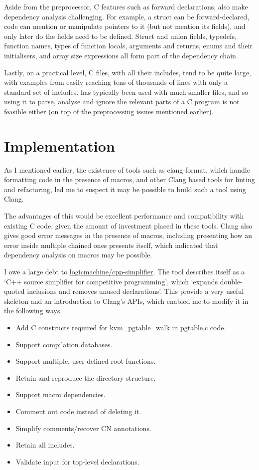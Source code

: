 Aside from the preprocessor, C features such as forward declarations, also make
dependency analysis challenging. For example, a struct can be forward-declared,
code can mention or manipulate pointers to it (but not mention its fields), and
only later do the fields need to be defined. Struct and union fields, typedefs,
function names, types of function locals, arguments and returns, enums and
their initialisers, and array size expressions all form part of the dependency
chain.

Lastly, on a practical level, C files, with all their includes, tend to be
quite large, with examples from  easily reaching tens of thousands of
lines with only a standard set of includes.  has typically been
used with much smaller files, and so using it to parse, analyse and ignore the
relevant parts of a C program is not feasible either (on top of the
preprocessing issues mentioned earlier).

\section{Implementation}

As I mentioned earlier, the existence of tools such as clang-format, which
handle formatting code in the presence of macros, and other Clang based tools
for linting and refactoring, led me to suspect it may be possible to build such
a tool using Clang.

The advantages of this would be excellent performance and compatibility with
existing C code, given the amount of investment placed in these tools. Clang
also gives good error messages in the presence of macros, including presenting
how an error inside multiple chained ones presents itself, which indicated that
dependency analysis on macros may be possible.

I owe a large debt to
\href{https://github.com/logicmachine/cpp-simplifier}{logicmachine/cpp-simplifier}.
The tool describes itself as a `C++ source simplifier for competitive programming',
which `expands double-quoted inclusions and removes unused declarations'.
This provide a very useful skeleton and an introduction to Clang's APIs, which
enabled me to modify it in the following ways.
\begin{itemize}
    \item Add C constructs required for kvm\_pgtable\_walk in pgtable.c code.
    \item Support compilation databases.
    \item Support multiple, user-defined root functions.
    \item Retain and reproduce the directory structure.
    \item Support macro dependencies.
    \item Comment out code instead of deleting it.
    \item Simplify comments/recover CN annotations.
    \item Retain all includes.
    \item Validate input for top-level declarations.
\end{itemize}

